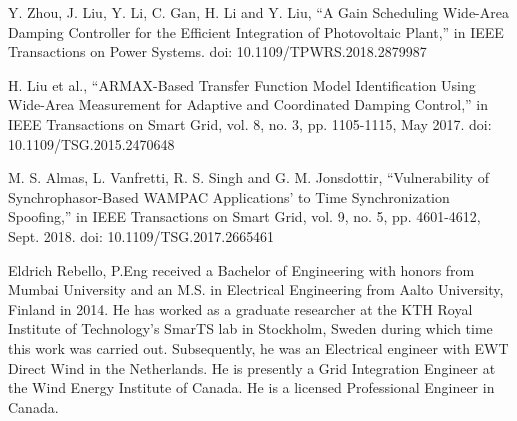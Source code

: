 \documentclass{ieeeaccess}
\begin{document}
\begin{thebibliography}{00}
 Y. Zhou, J. Liu, Y. Li, C. Gan, H. Li and Y. Liu, ``A Gain Scheduling Wide-Area Damping Controller for the Efficient Integration of Photovoltaic Plant,'' in IEEE Transactions on Power Systems. doi: 10.1109/TPWRS.2018.2879987

 H. Liu et al., ``ARMAX-Based Transfer Function Model Identification Using Wide-Area Measurement for Adaptive and Coordinated Damping Control,'' in IEEE Transactions on Smart Grid, vol. 8, no. 3, pp. 1105-1115, May 2017. doi: 10.1109/TSG.2015.2470648

 M. S. Almas, L. Vanfretti, R. S. Singh and G. M. Jonsdottir, ``Vulnerability of Synchrophasor-Based WAMPAC Applications’ to Time Synchronization Spoofing,'' in IEEE Transactions on Smart Grid, vol. 9, no. 5, pp. 4601-4612, Sept. 2018. doi: 10.1109/TSG.2017.2665461

\end{thebibliography}

\begin{IEEEbiography}{Eldrich Rebello, P.Eng}
received a Bachelor of Engineering with honors from Mumbai University and an M.S. in Electrical Engineering from Aalto University, Finland in 2014. He has worked as a graduate researcher at the KTH Royal Institute of Technology's SmarTS lab in Stockholm, Sweden during which time this work was carried out. Subsequently, he was an Electrical engineer with EWT Direct Wind in the Netherlands. He is presently a Grid Integration Engineer at the Wind Energy Institute of Canada. He is a licensed Professional Engineer in Canada.
\end{IEEEbiography}
\end{document}
